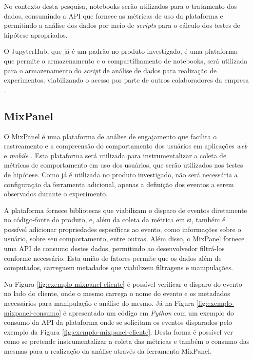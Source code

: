 No contexto desta pesquisa, notebooks serão utilizados para o tratamento dos dados, consumindo a API que fornece as métricas de uso da plataforma e permitindo a análise dos dados por meio de \textit{scripts} para o cálculo dos testes de hipótese apropriados.

O JupyterHub, que já é um padrão no produto investigado, é uma plataforma que permite o armazenamento e o compartilhamento de notebooks, será utilizada para o armazenamento do \textit{script} de análise de dados para realização de experimentos, viabilizando o acesso por parte de outros colaboradores da empresa \cite{jupyterhub}.

\subsection{MixPanel}

O MixPanel é uma plataforma de análise de engajamento que facilita o rastreamento e a compreensão do comportamento dos usuários em aplicações \textit{web} e \textit{mobile} \cite{mixpanel2024}. Esta plataforma será utilizada para instrumentalizar a coleta de métricas de comportamento em uso dos usuários, que serão utilizados nos testes de hipótese. Como já é utilizada no produto investigado, não será necessária a configuração da ferramenta adicional, apenas a definição dos eventos a serem observados durante o experimento.

A plataforma fornece bibliotecas que viabilizam o disparo de eventos diretamente no código-fonte do produto, e, além da coleta da métrica em si, também é possível adicionar propriedades específicas ao evento, como informações sobre o usuário, sobre seu comportamento, entre outras. Além disso, o MixPanel fornece uma API de consumo destes dados, permitindo ao desenvolvedor filtrá-los conforme necessário. Esta união de fatores permite que os dados além de computados, carreguem metadados que viabilizem filtragens e manipulações.

Na Figura \ref{fig:exemplo-mixpanel-cliente} é possível verificar o disparo do evento no lado do cliente, onde o mesmo carrega o nome do evento e os metadados necessários para manipulação e análise do mesmo. Já na Figura \ref{fig:exemplo-mixpanel-consumo} é apresentado um código em \textit{Python} com um exemplo do consumo da API da plataforma onde se solicitam os eventos disparados pelo exemplo da Figura \ref{fig:exemplo-mixpanel-cliente}. Desta forma é possível ver como se pretende instrumentalizar a coleta das métricas e também o consumo das mesmas para a realização da análise através da ferramenta MixPanel.

